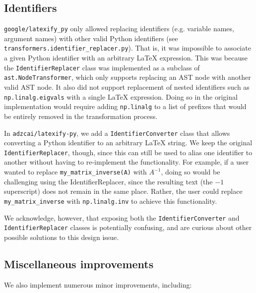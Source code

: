 \documentclass{article}
\newcommand{\ourpkg}{\texttt{adzcai/latexify-py}}
\newcommand{\theirpkg}{\texttt{google/latexify\_py}}
\begin{document}
\subsection{Identifiers}
\label{sec:identifiers}

\theirpkg{} only allowed replacing identifiers (e.g. variable names, argument names)
with other valid Python identifiers (see \verb|transformers.identifier_replacer.py|).
That is, it was impossible to associate a given Python identifier with an arbitrary \LaTeX{} expression.
This was because the \verb|IdentifierReplacer| class was implemented as a subclass of \verb|ast.NodeTransformer|,
which only supports replacing an AST node with another valid AST node.
It also did not support replacement of nested identifiers such as \verb|np.linalg.eigvals| with a single LaTeX expression.
Doing so in the original implementation would require adding \verb|np.linalg| to a list of prefixes that would be entirely removed in the transformation process.

In \ourpkg{}, we add a \verb|IdentifierConverter| class that allows converting a Python identifier to an arbitrary \LaTeX{} string.
We keep the original \verb|IdentifierReplacer|, though, since this can still be used to alias one identifier to another
without having to re-implement the functionality.
For example, if a user wanted to replace \verb|my_matrix_inverse(A)| with \(A^{-1}\),
doing so would be challenging using the IdentifierReplacer,
since the resulting text (the \(-1\) superscript) does not remain in the same place.
Rather, the user could replace \verb|my_matrix_inverse| with \verb|np.linalg.inv| to achieve this functionality.

We acknowledge, however, that exposing both the \verb|IdentifierConverter| and \verb|IdentifierReplacer| classes
is potentially confusing,
and are curious about other possible solutions to this design issue.

\subsection{Miscellaneous improvements}

We also implement numerous minor improvements, including:
\end{document}
